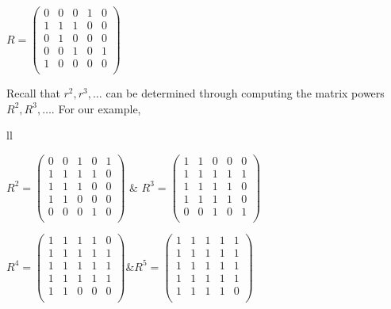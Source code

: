 \documentclass[10pt,]{book}
\theoremstyle{plain}
\theoremstyle{definition}
\theoremstyle{definition}
\theoremstyle{definition}
\theoremstyle{definition}
\begin{document}
 \(R=\left(
\begin{array}{ccccc}
 0 & 0 & 0 & 1 & 0 \\
 1 & 1 & 1 & 0 & 0 \\
 0 & 1 & 0 & 0 & 0 \\
 0 & 0 & 1 & 0 & 1 \\
 1 & 0 & 0 & 0 & 0 \\
\end{array}
\right)\)%
\par
Recall that \(r^2, r^3, \ldots\)  can be determined through computing the matrix powers \(R^2, R^3, \ldots\).  For our example,%
\leavevmode%
\begin{table}
\centering
\begin{tabular}{ll}

 \(R^2=\left(
\begin{array}{ccccc}
 0 & 0 & 1 & 0 & 1 \\
 1 & 1 & 1 & 1 & 0 \\
 1 & 1 & 1 & 0 & 0 \\
 1 & 1 & 0 & 0 & 0 \\
 0 & 0 & 0 & 1 & 0 \\
\end{array}
\right)\) & \(R^3=\left(
\begin{array}{ccccc}
 1 & 1 & 0 & 0 & 0 \\
 1 & 1 & 1 & 1 & 1 \\
 1 & 1 & 1 & 1 & 0 \\
 1 & 1 & 1 & 1 & 0 \\
 0 & 0 & 1 & 0 & 1 \\
\end{array}
\right)\)\tabularnewline[0pt]

 \(R^4=\left(
\begin{array}{ccccc}
 1 & 1 & 1 & 1 & 0 \\
 1 & 1 & 1 & 1 & 1 \\
 1 & 1 & 1 & 1 & 1 \\
 1 & 1 & 1 & 1 & 1 \\
 1 & 1 & 0 & 0 & 0 \\
\end{array}
\right)\)&\(R^5=\left(
\begin{array}{ccccc}
 1 & 1 & 1 & 1 & 1 \\
 1 & 1 & 1 & 1 & 1 \\
 1 & 1 & 1 & 1 & 1 \\
 1 & 1 & 1 & 1 & 1 \\
 1 & 1 & 1 & 1 & 0 \\
\end{array}
\right)\)
\end{tabular}
\end{table}
\end{document}
